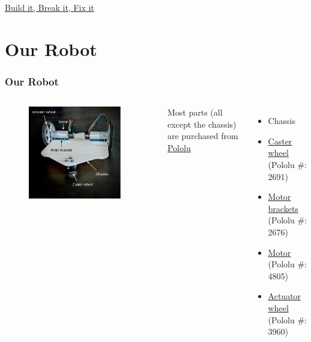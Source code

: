 \documentclass[12pt,letterpaper]{beamer}
\begin{document}
\begin{frame}{}
    \href{https://youtu.be/EezdinoG4mk}{Build it, Break it, Fix it}
    
\end{frame}

\section{Our Robot}

\begin{frame}
\frametitle{Our Robot}

\begin{columns}

\begin{figure}
    \includegraphics[width=0.9\textwidth]{3421bot}
\end{figure}

Most parts (all except the chassis) are purchased from \href{https://www.pololu.com/}{Pololu}
{\scriptsize 
\begin{itemize}
    \item Chassis
    \item \href{https://www.pololu.com/product/2691}{Caster wheel} (Pololu \#: 2691) 
    \item \href{https://www.pololu.com/product/2676}{Motor brackets} (Pololu \#: 2676)
    \item \href{https://www.pololu.com/product/4805}{Motor} (Pololu \#: 4805)
    \item \href{https://www.pololu.com/product/3960}{Actuator wheel} (Pololu \#: 3960)
\end{itemize}
}
\end{columns}
\end{frame}
\end{document}
